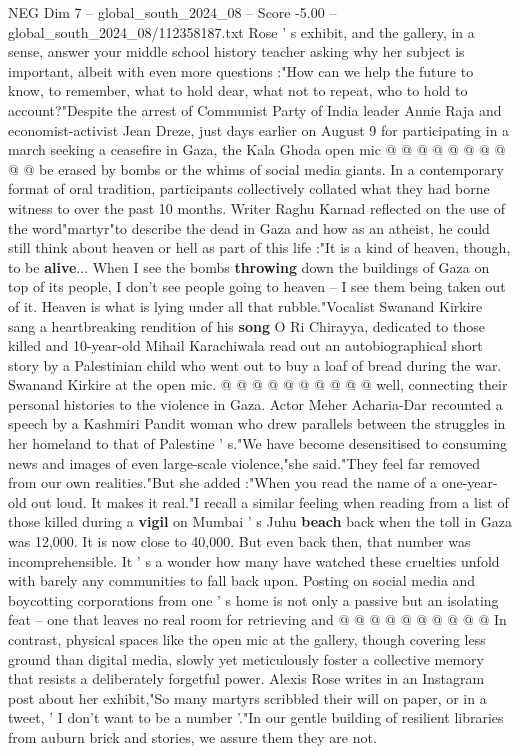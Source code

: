 \begin{textsample}{NEG Dim 7 – global\_south\_2024\_08 – Score -5.00 – global\_south\_2024\_08/112358187.txt}
Rose ' s exhibit, and the gallery, in a sense, answer your middle school history teacher asking why her subject is important, albeit with even more questions :"How can we help the future to know, to remember, what to hold dear, what not to repeat, who to hold to account?"Despite the arrest of Communist Party of India leader Annie Raja and economist-activist Jean Dreze, just days earlier on August 9 for participating in a march seeking a ceasefire in Gaza, the Kala Ghoda open mic @ @ @ @ @ @ @ @ @ @ be erased by bombs or the whims of social media giants.
In a contemporary format of oral tradition, participants collectively collated what they had borne witness to over the past 10 months.
Writer Raghu Karnad reflected on the use of the word"martyr"to describe the dead in Gaza and how as an atheist, he could still think about heaven or hell as part of this life :"It is a kind of heaven, though, to be \textbf{alive}...
When I see the bombs \textbf{throwing} down the buildings of Gaza on top of its people, I don't see people going to heaven -- I see them being taken out of it.
Heaven is what is lying under all that rubble."Vocalist Swanand Kirkire sang a heartbreaking rendition of his \textbf{song} O Ri Chirayya, dedicated to those killed and 10-year-old Mihail Karachiwala read out an autobiographical short story by a Palestinian child who went out to buy a loaf of bread during the war.
Swanand Kirkire at the open mic. @ @ @ @ @ @ @ @ @ @ well, connecting their personal histories to the violence in Gaza.
Actor Meher Acharia-Dar recounted a speech by a Kashmiri Pandit woman who drew parallels between the struggles in her homeland to that of Palestine ' s."We have become desensitised to consuming news and images of even large-scale violence,"she said."They feel far removed from our own realities."But she added :"When you read the name of a one-year-old out loud.
It makes it real."I recall a similar feeling when reading from a list of those killed during a \textbf{vigil} on Mumbai ' s Juhu \textbf{beach} back when the toll in Gaza was 12,000.
It is now close to 40,000.
But even back then, that number was incomprehensible.
It ' s a wonder how many have watched these cruelties unfold with barely any communities to fall back upon.
Posting on social media and boycotting corporations from one ' s home is not only a passive but an isolating feat -- one that leaves no real room for retrieving and @ @ @ @ @ @ @ @ @ @ In contrast, physical spaces like the open mic at the gallery, though covering less ground than digital media, slowly yet meticulously foster a collective memory that resists a deliberately forgetful power.
Alexis Rose writes in an Instagram post about her exhibit,"So many martyrs scribbled their will on paper, or in a tweet, ' I don't want to be a number '."In our gentle building of resilient libraries from auburn brick and stories, we assure them they are not.

\end{textsample}
